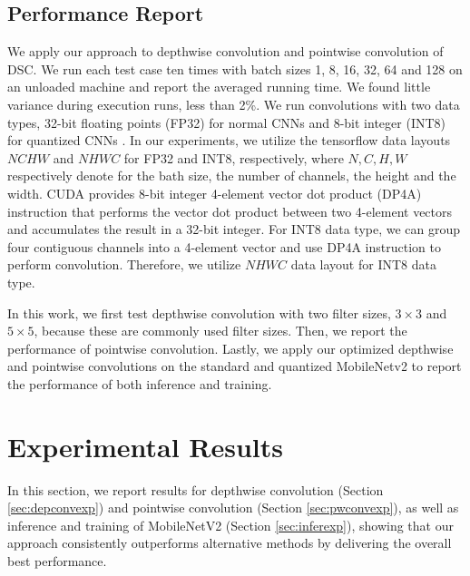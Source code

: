 \subsection{Performance Report}
We apply our approach to depthwise convolution and pointwise convolution of DSC.  We run each test case ten times with batch sizes 1, 8,
16, 32, 64 and 128 on an unloaded machine and report the averaged running time. We found little variance during execution runs, less than
2\%. We run convolutions with two data types, 32-bit floating points (FP32) for normal CNNs and 8-bit integer (INT8) for quantized CNNs
\cite{nagel2019data}. In our experiments, we utilize the tensorflow data layouts $NCHW$ and $NHWC$ for FP32 and INT8, respectively, where $N, C,
H, W$ respectively denote for the bath size, the number of channels, the height and the width. CUDA \cite{cudatoolkit} provides 8-bit integer 4-element vector dot product (DP4A) instruction that performs the vector dot product between two 4-element vectors and accumulates the result in a 32-bit integer. For INT8 data type, we can group four contiguous channels into a 4-element vector and use DP4A instruction to perform convolution. Therefore, we utilize $NHWC$ data layout for INT8 data type.

In this work, we first test depthwise convolution with two filter sizes, $3 \times 3$ and $5 \times 5$, because these are commonly used
filter sizes. Then, we report the performance of pointwise convolution. Lastly, we apply our optimized depthwise and pointwise convolutions
on the standard and quantized MobileNetv2 to report the performance of both inference and training.
%

\section{Experimental Results}
\label{exp} In this section, we report results for depthwise convolution (Section \ref{sec:depconvexp}) and pointwise convolution (Section
\ref{sec:pwconvexp}), as well as inference and training of MobileNetV2 (Section \ref{sec:inferexp}), showing that our approach consistently
outperforms alternative methods by delivering the overall best performance.


